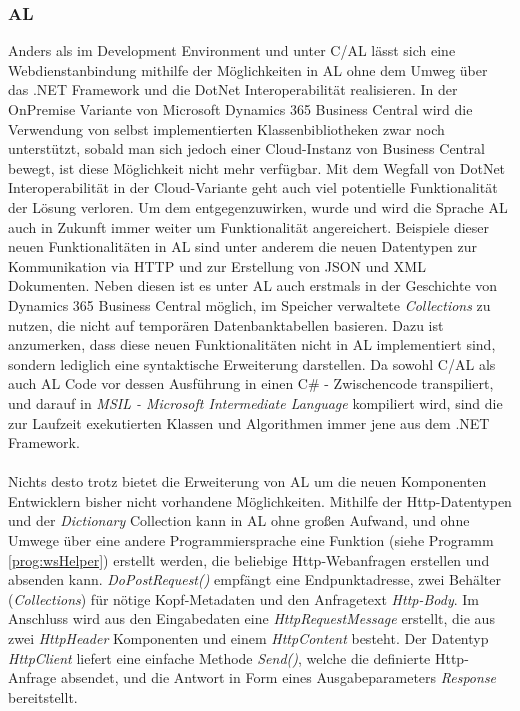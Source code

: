 \subsubsection{AL}
Anders als im Development Environment und unter C/AL lässt sich eine Webdienstanbindung mithilfe der Möglichkeiten in AL ohne dem Umweg über das .NET Framework und die DotNet Interoperabilität realisieren. In der OnPremise Variante von Microsoft Dynamics 365 Business Central wird die Verwendung von selbst implementierten Klassenbibliotheken zwar noch unterstützt, sobald man sich jedoch einer Cloud-Instanz von Business Central bewegt, ist diese Möglichkeit nicht mehr verfügbar. Mit dem Wegfall von DotNet Interoperabilität in der Cloud-Variante geht auch viel potentielle Funktionalität der Lösung verloren. Um dem entgegenzuwirken, wurde und wird die Sprache AL auch in Zukunft immer weiter um Funktionalität angereichert. Beispiele dieser neuen Funktionalitäten in AL sind unter anderem die neuen Datentypen zur Kommunikation via HTTP und zur Erstellung von JSON und XML Dokumenten. Neben diesen ist es unter AL auch erstmals in der Geschichte von Dynamics 365 Business Central möglich, im Speicher verwaltete \textit{Collections} zu nutzen, die nicht auf temporären Datenbanktabellen basieren. Dazu ist anzumerken, dass diese neuen Funktionalitäten nicht in AL implementiert sind, sondern lediglich eine syntaktische Erweiterung darstellen. Da sowohl C/AL als auch AL Code vor dessen Ausführung in einen C\# - Zwischencode transpiliert, und darauf in \textit{MSIL - Microsoft Intermediate Language} kompiliert wird, sind die zur Laufzeit exekutierten Klassen und Algorithmen immer jene aus dem .NET Framework. \linebreak

\paragraph{}
Nichts desto trotz bietet die Erweiterung von AL um die neuen Komponenten Entwicklern bisher nicht vorhandene Möglichkeiten. Mithilfe der Http-Datentypen und der \textit{Dictionary} Collection kann in AL ohne großen Aufwand, und ohne Umwege über eine andere Programmiersprache eine Funktion (siehe Programm \ref{prog:wsHelper}) erstellt werden, die beliebige Http-Webanfragen erstellen und absenden kann. \textit{DoPostRequest()} empfängt eine Endpunktadresse, zwei Behälter (\textit{Collections}) für nötige Kopf-Metadaten und den Anfragetext \textit{Http-Body}. Im Anschluss wird aus den Eingabedaten eine \textit{HttpRequestMessage} erstellt, die aus zwei \textit{HttpHeader} Komponenten und einem \textit{HttpContent} besteht. Der Datentyp \textit{HttpClient} liefert eine einfache Methode \textit{Send()}, welche die definierte Http-Anfrage absendet, und die Antwort in Form eines Ausgabeparameters \textit{Response} bereitstellt.

